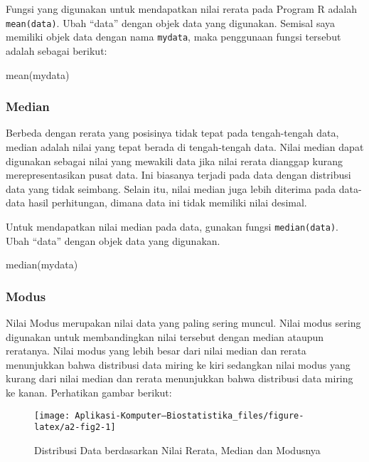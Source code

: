 \documentclass[
]{book}
\newenvironment{Shaded}{\begin{snugshade}}{\end{snugshade}}
\newcommand{\FunctionTok}[1]{\textcolor[rgb]{0.00,0.00,0.00}{#1}}
\newcommand{\NormalTok}[1]{#1}
\begin{document}
Fungsi yang digunakan untuk mendapatkan nilai rerata pada Program R adalah \texttt{mean(data)}. Ubah ``data'' dengan objek data yang digunakan. Semisal saya memiliki objek data dengan nama \texttt{mydata}, maka penggunaan fungsi tersebut adalah sebagai berikut:

\begin{Shaded}
\begin{Highlighting}[]
\FunctionTok{mean}\NormalTok{(mydata)}
\end{Highlighting}
\end{Shaded}

\hypertarget{median}{%
\subsubsection{Median}\label{median}}

Berbeda dengan rerata yang posisinya tidak tepat pada tengah-tengah data, median adalah nilai yang tepat berada di tengah-tengah data. Nilai median dapat digunakan sebagai nilai yang mewakili data jika nilai rerata dianggap kurang merepresentasikan pusat data. Ini biasanya terjadi pada data dengan distribusi data yang tidak seimbang. Selain itu, nilai median juga lebih diterima pada data-data hasil perhitungan, dimana data ini tidak memiliki nilai desimal.

Untuk mendapatkan nilai median pada data, gunakan fungsi \texttt{median(data)}. Ubah ``data'' dengan objek data yang digunakan.

\begin{Shaded}
\begin{Highlighting}[]
\FunctionTok{median}\NormalTok{(mydata)}
\end{Highlighting}
\end{Shaded}

\hypertarget{a2-modus}{%
\subsubsection{Modus}\label{a2-modus}}

Nilai Modus merupakan nilai data yang paling sering muncul. Nilai modus sering digunakan untuk membandingkan nilai tersebut dengan median ataupun reratanya. Nilai modus yang lebih besar dari nilai median dan rerata menunjukkan bahwa distribusi data miring ke kiri sedangkan nilai modus yang kurang dari nilai median dan rerata menunjukkan bahwa distribusi data miring ke kanan. Perhatikan gambar berikut:

\begin{figure}

{\centering \texttt{[image: Aplikasi-Komputer---Biostatistika\_files/figure-latex/a2-fig2-1]} 

}

\caption{Distribusi Data berdasarkan Nilai Rerata, Median dan Modusnya}\label{fig:a2-fig2}
\end{figure}
\end{document}
